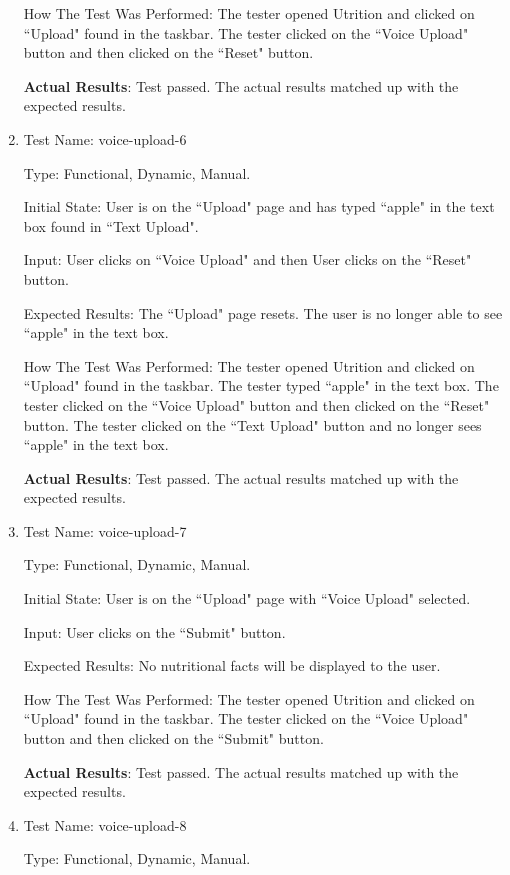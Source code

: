 \documentclass[12pt, titlepage]{article}
\begin{document}
\begin{enumerate}
		How The Test Was Performed: The tester opened Utrition and clicked on ``Upload" found in the taskbar. The tester clicked on the ``Voice Upload" button and then clicked on the ``Reset" button. 
		
		\textbf{Actual Results}: Test passed. The actual results matched up with the expected results.
		
		\item{Test Name: voice-upload-6}
		
		Type: Functional, Dynamic, Manual.
		
		Initial State: User is on the ``Upload" page and has typed ``apple" in the text box found in ``Text Upload".
		
		Input: User clicks on ``Voice Upload" and then User clicks on the ``Reset" button.
		
		Expected Results: The ``Upload" page resets. The user is no longer able to see ``apple" in the text box.
		
		How The Test Was Performed: The tester opened Utrition and clicked on ``Upload" found in the taskbar. The tester typed ``apple" in the text box. The tester clicked on the ``Voice Upload" button and then clicked on the ``Reset" button. The tester clicked on the ``Text Upload" button and no longer sees ``apple" in the text box.
		
		\textbf{Actual Results}: Test passed. The actual results matched up with the expected results.
		
		\item{Test Name: voice-upload-7}
		
		Type: Functional, Dynamic, Manual.
		
		Initial State: User is on the ``Upload" page with ``Voice Upload" selected.
		
		Input: User clicks on the ``Submit" button.
		
		Expected Results: No nutritional facts will be displayed to the user.
		
		How The Test Was Performed: The tester opened Utrition and clicked on ``Upload" found in the taskbar. The tester clicked on the ``Voice Upload" button and then clicked on the ``Submit" button.
		
		\textbf{Actual Results}: Test passed. The actual results matched up with the expected results.
		
		\item{Test Name: voice-upload-8}
		
		Type: Functional, Dynamic, Manual.
		

\end{enumerate}
\end{document}
